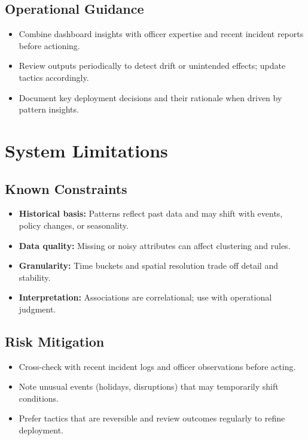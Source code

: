 \documentclass[11pt]{article}
\begin{document}
\subsection{Operational Guidance}
\begin{itemize}[leftmargin=*]
  \item Combine dashboard insights with officer expertise and recent incident reports before actioning.
  \item Review outputs periodically to detect drift or unintended effects; update tactics accordingly.
  \item Document key deployment decisions and their rationale when driven by pattern insights.
\end{itemize}

\section{System Limitations}

\subsection{Known Constraints}
\begin{itemize}[leftmargin=*]
  \item \textbf{Historical basis:} Patterns reflect past data and may shift with events, policy changes, or seasonality.
  \item \textbf{Data quality:} Missing or noisy attributes can affect clustering and rules.
  \item \textbf{Granularity:} Time buckets and spatial resolution trade off detail and stability.
  \item \textbf{Interpretation:} Associations are correlational; use with operational judgment.
\end{itemize}

\subsection{Risk Mitigation}
\begin{itemize}[leftmargin=*]
  \item Cross-check with recent incident logs and officer observations before acting.
  \item Note unusual events (holidays, disruptions) that may temporarily shift conditions.
  \item Prefer tactics that are reversible and review outcomes regularly to refine deployment.
\end{itemize}
\end{document}
